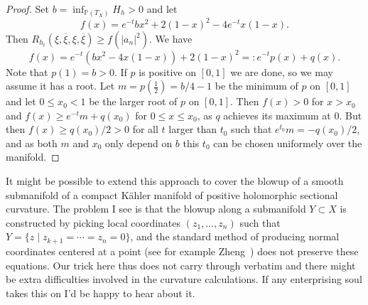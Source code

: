 \documentclass[10pt,a4paper]{amsart}
\newcommand{\kk}[1]{\mathbb{#1}}
\def\ov#1{\overline{#1}}
\def\hsc{holomorphic sectional curvature}
\begin{document}
\begin{proof}
Set $b = \inf_{\kk P(T_X)} H_h > 0$ and let
$$
f(x) = e^{-t} b x^2 + 2(1-x)^2 - 4e^{-t} x(1-x).
$$
Then $R_{h_t}(\xi, \ov\xi, \xi, \ov\xi) \geq f(|a_n|^2)$.
We have
$$
f(x) = e^{-t}(b x^2 - 4 x(1-x)) + 2(1-x)^2
=: e^{-t} p(x) + q(x).
$$
Note that $p(1) = b > 0$.
If $p$ is positive on $[0,1]$ we are done, so we may assume it has a root. Let
$m = p(\frac12) = b/4-1$ be the minimum of $p$ on $[0,1]$ and let $0 \leq x_0 <
1$ be the larger root of $p$ on $[0,1]$.
Then $f(x) > 0$ for $x > x_0$ and $f(x) \geq e^{-t} m + q(x_0)$ for $0 \leq x
\leq x_0$, as $q$ achieves its maximum at $0$.
But then $f(x) \geq q(x_0)/2 > 0$ for all $t$ larger than $t_0$ such that
$e^{t_0}m = -q(x_0)/2$, and as both $m$ and $x_0$ only depend on $b$ this $t_0$
can be chosen uniformely over the manifold.
\end{proof}



It might be possible to extend this approach to cover the blowup of a smooth
submanifold of a compact K\"ahler manifold of positive \hsc.
The problem I see is that the blowup along a submanifold $Y \subset X$ is
constructed by picking local coordinates $(z_1,\ldots,z_n)$ such that $Y = \{z
\mid z_{k+1} = \cdots = z_n = 0\}$,
and the standard method of producing normal coordinates centered at a point
(see for example Zheng~\cite{zheng2000complex})
does not preserve these equations.
Our trick here thus does not carry through verbatim and there might be extra
difficulties involved in the curvature calculations.
If any enterprising soul takes this on I'd be happy to hear about it.








\end{document}
